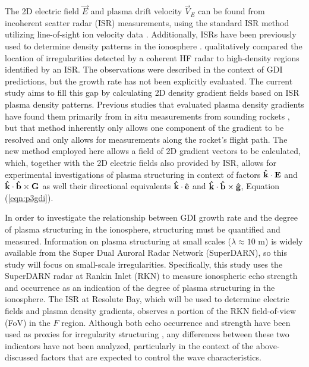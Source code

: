 The 2D electric field \(\vec{E}\)  and plasma drift velocity \(\vec{V}_E\) can be found from incoherent scatter radar (ISR) measurements, using the standard ISR method utilizing line-of-sight ion velocity data \citep{Heinselman2008}.  Additionally, ISRs have been previously used to determine density patterns in the ionosphere \citep{Semeter2009,Dahlgren2012a,Dahlgren2012b}. \citet{Dahlgren2012b} qualitatively compared the location of irregularities detected by a coherent HF radar to high-density regions identified by an ISR.  The observations were described in the context of GDI predictions, but the growth rate has not been explicitly evaluated. The current study aims to fill this gap by calculating 2D density gradient fields based on ISR plasma density patterns. Previous studies that evaluated plasma density gradients have found them primarily from in situ measurements from sounding rockets \citep{Moen2012,Lynch2015}, but that method inherently only allows one component of the gradient to be resolved and only allows for measurements along the rocket's flight path.  The new method employed here allows a field of 2D gradient vectors to be calculated, which, together with the 2D electric fields also provided by ISR, allows for experimental investigations of plasma structuring in context of factors \(\mathbf{\hat{k}}\cdot\mathbf{E}\) and \(\mathbf{\hat{k}}\cdot\mathbf{\hat{b}}\times\mathbf{G}\) as well their directional equivalents \(\mathbf{\hat{k}}\cdot\mathbf{\hat{e}}\) and \(\mathbf{\hat{k}}\cdot\mathbf{\hat{b}}\times\mathbf{\hat{g}}\), Equation (\ref{eqn:p3gdi}).

In order to investigate the relationship between GDI growth rate and the degree of plasma structuring in the ionosphere, structuring must be quantified and measured.  Information on plasma structuring at small scales (\(\lambda \approx 10\) m) is widely available from the Super Dual Auroral Radar Network (SuperDARN), so this study will focus on small-scale irregularities.  Specifically, this study uses the SuperDARN radar at Rankin Inlet (RKN) to measure ionospheric echo strength and occurrence as an indication of the degree of plasma structuring in the ionosphere. The ISR at Resolute Bay, which will be used to determine electric fields and plasma density gradients, observes a portion of the RKN field-of-view (FoV) in the \(F\) region.  Although both echo occurrence and strength have been used as proxies for irregularity structuring \citep[e.g.][]{Milan2002b,Koustov2012}, any differences between these two indicators have not been analyzed, particularly in the context of the above-discussed factors that are expected to control the wave characteristics.

